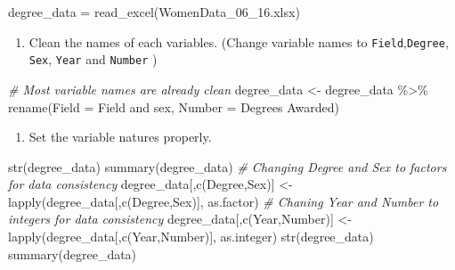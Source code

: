 \documentclass[
]{article}
\newenvironment{Shaded}{\begin{snugshade}}{\end{snugshade}}
\newcommand{\AttributeTok}[1]{\textcolor[rgb]{0.77,0.63,0.00}{#1}}
\newcommand{\CommentTok}[1]{\textcolor[rgb]{0.56,0.35,0.01}{\textit{#1}}}
\newcommand{\FunctionTok}[1]{\textcolor[rgb]{0.00,0.00,0.00}{#1}}
\newcommand{\NormalTok}[1]{#1}
\newcommand{\OtherTok}[1]{\textcolor[rgb]{0.56,0.35,0.01}{#1}}
\newcommand{\SpecialCharTok}[1]{\textcolor[rgb]{0.00,0.00,0.00}{#1}}
\newcommand{\StringTok}[1]{\textcolor[rgb]{0.31,0.60,0.02}{#1}}
\providecommand{\tightlist}{%
  \setlength{\itemsep}{0pt}\setlength{\parskip}{0pt}}
\begin{document}
\begin{Shaded}
\begin{Highlighting}[]
\NormalTok{degree\_data }\OtherTok{=} \FunctionTok{read\_excel}\NormalTok{(}\StringTok{\textquotesingle{}WomenData\_06\_16.xlsx\textquotesingle{}}\NormalTok{)}
\end{Highlighting}
\end{Shaded}

\begin{enumerate}
\def\labelenumi{\roman{enumi}.}
\setcounter{enumi}{1}
\tightlist
\item
  Clean the names of each variables. (Change variable names to
  \texttt{Field},\texttt{Degree}, \texttt{Sex}, \texttt{Year} and
  \texttt{Number} )
\end{enumerate}

\begin{Shaded}
\begin{Highlighting}[]
\CommentTok{\# Most variable names are already clean}
\NormalTok{degree\_data }\OtherTok{\textless{}{-}}\NormalTok{ degree\_data }\SpecialCharTok{\%\textgreater{}\%} \FunctionTok{rename}\NormalTok{(}\AttributeTok{Field =} \StringTok{\textasciigrave{}}\AttributeTok{Field and sex}\StringTok{\textasciigrave{}}\NormalTok{, }\AttributeTok{Number =} \StringTok{\textasciigrave{}}\AttributeTok{Degrees Awarded}\StringTok{\textasciigrave{}}\NormalTok{)}
\end{Highlighting}
\end{Shaded}

\begin{enumerate}
\def\labelenumi{\roman{enumi}.}
\setcounter{enumi}{2}
\tightlist
\item
  Set the variable natures properly.
\end{enumerate}

\begin{Shaded}
\begin{Highlighting}[]
\FunctionTok{str}\NormalTok{(degree\_data)}
\FunctionTok{summary}\NormalTok{(degree\_data)}
\CommentTok{\# Changing Degree and Sex to factors for data consistency}
\NormalTok{degree\_data[,}\FunctionTok{c}\NormalTok{(}\StringTok{\textquotesingle{}Degree\textquotesingle{}}\NormalTok{,}\StringTok{\textquotesingle{}Sex\textquotesingle{}}\NormalTok{)] }\OtherTok{\textless{}{-}} \FunctionTok{lapply}\NormalTok{(degree\_data[,}\FunctionTok{c}\NormalTok{(}\StringTok{\textquotesingle{}Degree\textquotesingle{}}\NormalTok{,}\StringTok{\textquotesingle{}Sex\textquotesingle{}}\NormalTok{)], as.factor)}
\CommentTok{\# Chaning Year and Number to integers for data consistency}
\NormalTok{degree\_data[,}\FunctionTok{c}\NormalTok{(}\StringTok{\textquotesingle{}Year\textquotesingle{}}\NormalTok{,}\StringTok{\textquotesingle{}Number\textquotesingle{}}\NormalTok{)] }\OtherTok{\textless{}{-}} \FunctionTok{lapply}\NormalTok{(degree\_data[,}\FunctionTok{c}\NormalTok{(}\StringTok{\textquotesingle{}Year\textquotesingle{}}\NormalTok{,}\StringTok{\textquotesingle{}Number\textquotesingle{}}\NormalTok{)], as.integer)}
\FunctionTok{str}\NormalTok{(degree\_data)}
\FunctionTok{summary}\NormalTok{(degree\_data)}
\end{Highlighting}
\end{Shaded}
\end{document}
